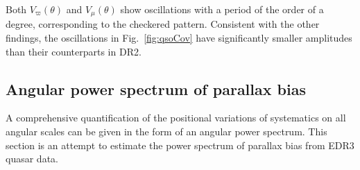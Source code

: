 \documentclass[longauth]{aa} %
\begin{document}
Both $V_\varpi(\theta)$ and $V_\mu(\theta)$
show oscillations with a period of the order of a degree, corresponding to
the checkered pattern. Consistent with the other findings, the oscillations in 
Fig.~\ref{fig:qsoCov} have significantly smaller amplitudes than their 
counterparts in DR2. 



\subsection{Angular power spectrum of parallax bias}
\label{sec:aps}

A comprehensive quantification of the positional variations of systematics on all 
angular scales can be given in the form of an angular power spectrum. This section
is an attempt to estimate the power spectrum of parallax bias from EDR3 quasar data.
\end{document}
